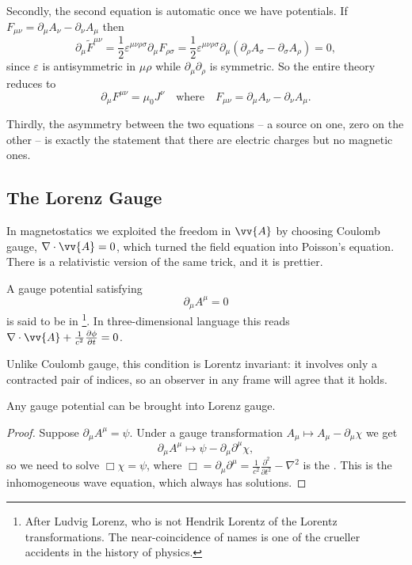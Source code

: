 Secondly, the second equation is automatic once we have potentials. If $F_{\mu\nu} = \partial_\mu A_\nu - \partial_\nu A_\mu$ then
$$
\partial_\mu \tilde F^{\mu\nu} = \frac{1}{2}\varepsilon^{\mu\nu\rho\sigma}\partial_\mu F_{\rho\sigma} = \frac{1}{2}\varepsilon^{\mu\nu\rho\sigma}\partial_\mu(\partial_\rho A_\sigma - \partial_\sigma A_\rho) = 0,
$$
since $\varepsilon$ is antisymmetric in $\mu\rho$ while $\partial_\mu\partial_\rho$ is symmetric. So the entire theory reduces to
$$
\partial_\mu F^{\mu\nu} = \mu_0 J^\nu \quad \text{where}\quad F_{\mu\nu} = \partial_\mu A_\nu - \partial_\nu A_\mu.
$$

Thirdly, the asymmetry between the two equations -- a source on one, zero on the other -- is exactly the statement that there are electric charges but no magnetic ones.

\subsection{The Lorenz Gauge}

In magnetostatics we exploited the freedom in $\vv{A}$ by choosing Coulomb gauge, $\nabla\cdot\vv{A} = 0$, which turned the field equation into Poisson's equation. There is a relativistic version of the same trick, and it is prettier.

\begin{definition}
	A gauge potential satisfying
	$$
	\partial_\mu A^\mu = 0
	$$
	is said to be in \footnote{After Ludvig Lorenz, who is not Hendrik Lorentz of the Lorentz transformations. The near-coincidence of names is one of the crueller accidents in the history of physics.}. In three-dimensional language this reads $\nabla\cdot\vv{A} + \frac{1}{c^2}\frac{\partial \phi}{\partial t} = 0$.
\end{definition}

Unlike Coulomb gauge, this condition is Lorentz invariant: it involves only a contracted pair of indices, so an observer in any frame will agree that it holds.

\begin{proposition}
	Any gauge potential can be brought into Lorenz gauge.
\end{proposition}
\begin{proof}
	Suppose $\partial_\mu A^\mu = \psi$. Under a gauge transformation $A_\mu \mapsto A_\mu - \partial_\mu \chi$ we get
	$$
	\partial_\mu A^\mu \mapsto \psi - \partial_\mu \partial^\mu \chi,
	$$
	so we need to solve $\Box \chi = \psi$, where $\Box = \partial_\mu\partial^\mu = \frac{1}{c^2}\frac{\partial^2}{\partial t^2} - \nabla^2$ is the . This is the inhomogeneous wave equation, which always has solutions.
\end{proof}

